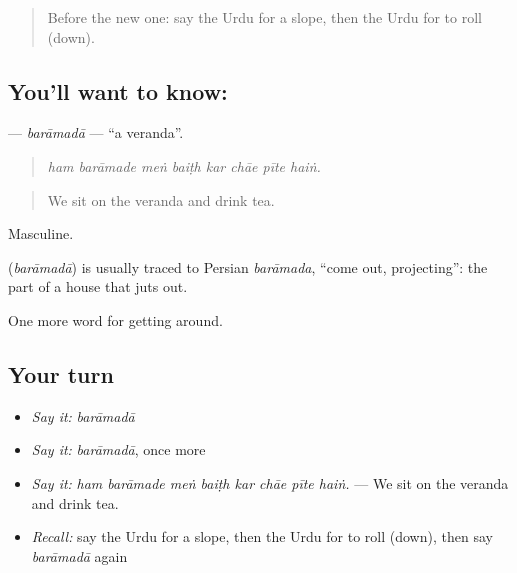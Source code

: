 \label{lesson:UR-C411-baramada}



\begin{quote}
Before the new one: say the Urdu for a slope, then the Urdu for to roll (down).
\end{quote}

\subsection*{You'll want to know: }
\textbf{} — \emph{barāmadā} — \textquotedblleft{}a veranda\textquotedblright{}.

\begin{quote}
       
\end{quote}

\begin{quote}
\emph{ham barāmade meṅ baiṭh kar chāe pīte haiṅ.}
\end{quote}

\begin{quote}
We sit on the veranda and drink tea.
\end{quote}

Masculine.

\begin{cousinweb}
\textbf{} (\emph{barāmadā}) is usually traced to Persian \emph{barāmada}, \textquotedblleft{}come out, projecting\textquotedblright{}: the part of a house that juts out.
\end{cousinweb}

\begin{grammarlens}[title={What you've built}]
One more word for getting around.
\end{grammarlens}

\subsection*{Your turn}
\begin{itemize}
\raggedright
  \item \emph{Say it:} \emph{barāmadā}
  \item \emph{Say it:} \emph{barāmadā}, once more
  \item \emph{Say it:} \emph{ham barāmade meṅ baiṭh kar chāe pīte haiṅ.} — We sit on the veranda and drink tea.
  \item \emph{Recall:} say the Urdu for a slope, then the Urdu for to roll (down), then say \emph{barāmadā} again
\end{itemize}

